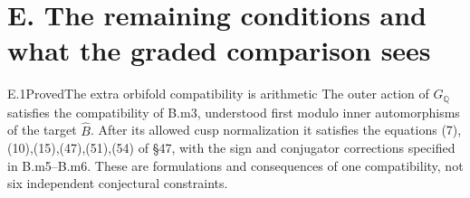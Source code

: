 \section{E. The remaining conditions and what the graded comparison sees}

\begin{claim}{E.1}{Proved}{The extra orbifold compatibility is arithmetic}
The outer action of $G_\mathbb Q$ satisfies the compatibility of B.m3,
understood first modulo inner automorphisms of the target $\widehat B$.
After its allowed cusp normalization it satisfies the equations
(7),(10),(15),(47),(51),(54) of \S47, with the sign and conjugator
corrections specified in B.m5--B.m6. These are formulations and consequences
of one compatibility, not six independent conjectural constraints.
\end{claim}

